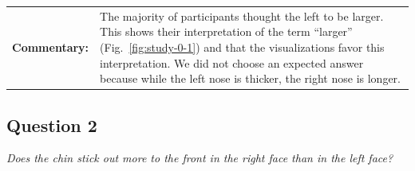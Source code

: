 \begin{tabular}{l p{}}
	{\bf Commentary:} & The majority of participants thought the left to be larger. This shows their interpretation of the term ``larger'' (Fig.~\ref{fig:study-0-1}) and that the visualizations favor this interpretation. We did not choose an expected answer because while the left nose is thicker, the right nose is longer. \\
\end{tabular}
 
\clearpage

\subsection{Question 2}
\label{attch:complete_study_results-question2}

\begin{center}{\it Does the chin stick out more to the front in the right face than in the left face?}\end{center}

